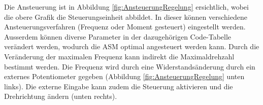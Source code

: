  Die Ansteuerung ist in Abbildung \ref{fig:AnsteuerungRegelung} ersichtlich, wobei die obere Grafik die Steuerungseinheit abbildet. In dieser können verschiedene Ansteuerungsverfahren (Frequenz oder Moment gesteuert) eingestellt werden. Ausserdem können diverse Parameter in der dazugehörigen Code-Tabelle verändert werden, wodurch die ASM optimal angesteuert werden kann. Durch die Veränderung der maximalen Frequenz kann indirekt die Maximaldrehzahl bestimmt werden. Die Frequenz wird durch eine Widerstandsänderung durch ein externes Potentiometer gegeben (Abbildung \ref{fig:AnsteuerungRegelung} unten links). Die externe Eingabe kann zudem die Steuerung aktivieren und die Drehrichtung ändern (unten rechts). 
